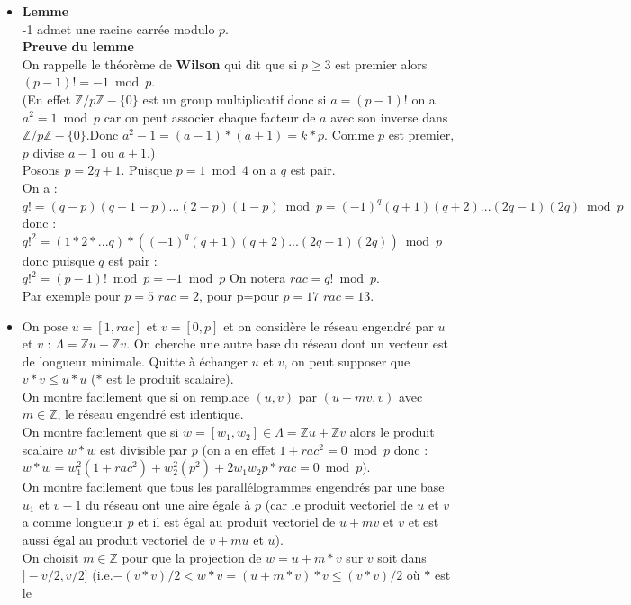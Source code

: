 \documentclass[a4paper,11pt]{book}
\newcommand{\Z}{{\mathbb{Z}}}
\begin{document}
\begin{itemize}
\item {\bf Lemme}\\
-1 admet une racine carr\'ee modulo $p$.\\
{\bf Preuve du lemme}\\
On rappelle le th\'eor\`eme de {\bf Wilson} qui dit que 
si $p\geq 3$ est premier alors $(p-1)!=-1 \bmod p$.\\
(En effet $\Z/p\Z-\{0\}$ est un group multiplicatif donc si $a=(p-1)!$ on a 
$a^2=1 \bmod p$ car on peut associer chaque facteur de $a$ avec son inverse 
dans $\Z/p\Z-\{0\}$.Donc $a^2-1=(a-1)*(a+1)=k*p$. Comme $p$ est premier, $p$ 
divise $a-1$ ou $a+1$.)\\
Posons $p=2q+1$. Puisque $p=1 \bmod 4$ on a $q$ est pair.\\
On a :\\
$q!=(q-p)(q-1-p)...(2-p)(1-p)\bmod p=(-1)^q(q+1)(q+2)...(2q-1)(2q)\bmod p$
donc :\\
$q!^2=(1*2*...q)*((-1)^q(q+1)(q+2)...(2q-1)(2q)) \bmod p$
donc puisque $q$ est pair :\\
$q!^2=(p-1)!\bmod p=-1 \bmod p$
On notera $rac=q!\bmod p$.\\
Par exemple pour $p=5$ $rac=2$, pour p=pour $p=17$ $rac=13$.
\item On pose $u=[1,rac]$ et $v=[0,p]$ et on consid\`ere le r\'eseau engendr\'e 
par $u$ et $v$ : $\Lambda=\Z u+\Z v$. On cherche une autre base du r\'eseau 
dont un vecteur est de longueur minimale. Quitte \`a \'echanger $u$ et $v$, on 
peut supposer que $v*v\leq u*u$ ($*$ est le produit scalaire).\\
On montre facilement que si on remplace $(u,v)$ par $(u+mv,v)$ avec $m\in \Z$,
le r\'eseau engendr\'e est identique. \\
On montre facilement que si $w=[w_1,w_2]\in \Lambda=\Z u+\Z v$ alors le produit
scalaire $w*w$ est divisible par $p$ (on a en effet $1+rac^2=0 \bmod p$ donc :\\
$w*w=w_1^2(1+rac^2)+w_2^2(p^2)+2w_1w_2p*rac=0 \bmod p$).\\
On montre facilement que tous les parall\'elogrammes engendr\'es par une base
$u_1$ et $v-1$ du r\'eseau ont une aire \'egale \`a $p$ (car le produit 
vectoriel de $u$ et $v$ a comme longueur $p$ et il est \'egal au produit 
vectoriel de $u+mv$ et $v$ et est aussi \'egal au produit vectoriel de $v+mu$ 
et $u$).\\ 
On choisit $m\in \Z$ pour que la projection de $w=u+m*v$ sur $v$ soit dans 
 $]-v/2,v/2]$ (i.e.$-(v*v)/2<w*v=(u+m*v)*v\leq (v*v)/2$ o\`u $*$ est le 

\end{itemize}
\end{document}
